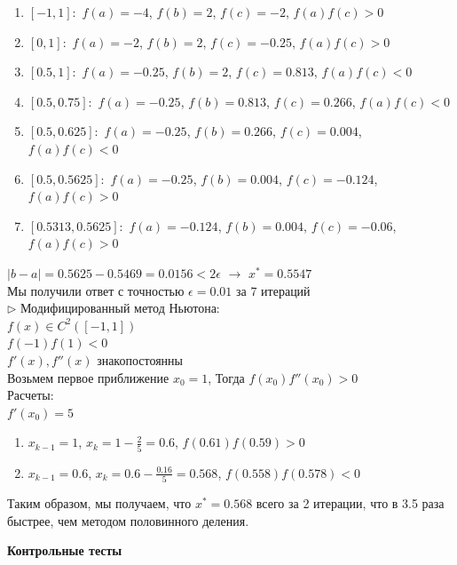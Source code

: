\documentclass{article}
\begin{document}
	\begin{enumerate}
		\item $[-1, 1]:$ $f(a) = -4$, $f(b) = 2$, $f(c) = -2$, $f(a)f(c) > 0$
		\item $[0, 1]:$ $f(a) = -2$, $f(b) = 2$, $f(c) = -0.25$, $f(a)f(c) > 0$
		\item $[0.5, 1]:$ $f(a) = -0.25$, $f(b) = 2$, $f(c) = 0.813$, $f(a)f(c) < 0$
		\item $[0.5, 0.75]:$ $f(a) = -0.25$, $f(b) = 0.813$, $f(c) = 0.266$, $f(a)f(c) < 0$
		\item $[0.5, 0.625]:$ $f(a) = -0.25$, $f(b) = 0.266$, $f(c) = 0.004$, $f(a)f(c) < 0$
		\item $[0.5, 0.5625]:$ $f(a) = -0.25$, $f(b) = 0.004$, $f(c) = -0.124$, $f(a)f(c) > 0$		
		\item $[0.5313, 0.5625]:$ $f(a) = -0.124$, $f(b) = 0.004$, $f(c) = -0.06$, $f(a)f(c) > 0$
	\end{enumerate}
	$|b - a| = 0.5625 - 0.5469 = 0.0156 < 2\epsilon$ $\rightarrow$ $x^* = 0.5547$\\
	Мы получили ответ с точностью $\epsilon = 0.01$ за 7 итераций\\
	$\triangleright$ Модифицированный метод Ньютона:\\
	$f(x) \in C^2([-1, 1])$\\
	$f(-1)f(1) < 0$\\
	$f'(x),f''(x)$ знакопостоянны\\
	Возьмем первое приближение $x_0 = 1$, Тогда $f(x_0)f''(x_0) > 0$\\
	Расчеты:\\
	$f'(x_0) = 5$
	\begin{enumerate}
		\item $x_{k-1} = 1$, $x_k = 1 - \frac{2}{5} = 0.6$, $f(0.61)f(0.59) > 0$
		\item $x_{k-1} = 0.6$, $x_k = 0.6 - \frac{0.16}{5} = 0.568$, $f(0.558)f(0.578) < 0$
	\end{enumerate}
	Таким образом, мы получаем, что $x^* = 0.568$ всего за 2 итерации, что в 3.5 раза быстрее, чем методом половинного деления.
	\begin{center} \textbf{Контрольные тесты}\end{center}
\end{document}
